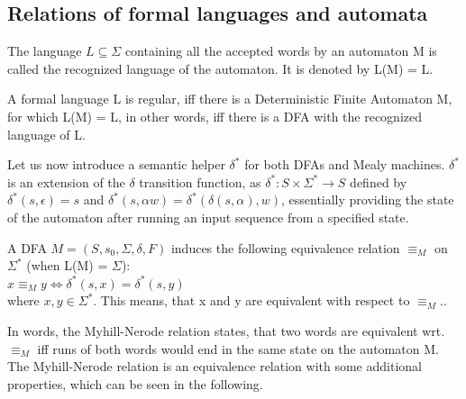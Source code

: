 \subsection{Relations of formal languages and automata}

\begin{definition}
	The language $L\subseteq\Sigma$ containing all the accepted words by an automaton M is called the recognized language of the automaton. It is denoted by L(M) = L.
\end{definition}

\begin{definition}
	A formal language L is regular, iff there is a Deterministic Finite Automaton M, for which L(M) = L, in other words, iff there is a DFA with the recognized language of L.
\end{definition}

Let us now introduce a semantic helper $\delta^*$ for both DFAs and Mealy machines. $\delta^*$ is an extension of the $\delta$ transition function, as $\delta^*: S\times\Sigma^* \to S$ defined by $\delta^*(s,\epsilon) = s$ and $\delta^*(s, \alpha w) = \delta^*(\delta(s, \alpha), w)$, essentially providing the state of the automaton after running an input sequence from a specified state.

\begin{definition} 
	A DFA $M=(S,s_{0},\Sigma,\delta,F)$ induces the following equivalence relation $\equiv_M$ on $\Sigma^*$ (when L(M) = $\Sigma$):\\
	\null\qquad$x\equiv_M y \iff \delta^*(s, x) = \delta^*(s, y)$\\
	where $x, y\in\Sigma^*$. This means, that x and y are equivalent with respect to $\equiv_M$.\cite{Kozen1977}.
\end{definition}

In words, the Myhill-Nerode relation states, that two words are equivalent wrt. $\equiv_M$ iff runs of both words would end in the same state on the automaton M. The Myhill-Nerode relation is an equivalence relation with some additional properties\cite{Kozen1977}, which can be seen in the following.



